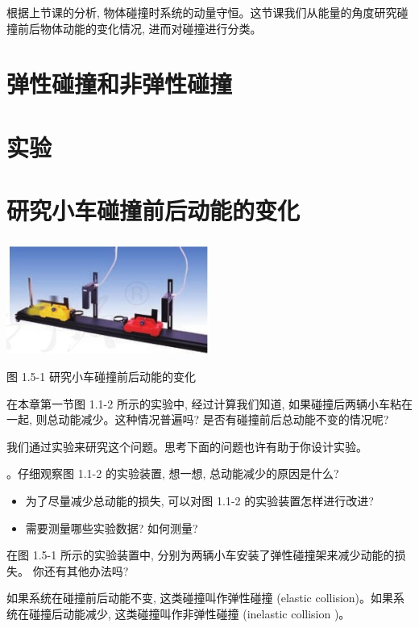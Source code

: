 \documentclass[10pt]{article}
\begin{document}
根据上节课的分析, 物体碰撞时系统的动量守恒。这节课我们从能量的角度研究碰撞前后物体动能的变化情况, 进而对碰撞进行分类。

\section*{弹性碰撞和非弹性碰撞}

\section*{实验}

\section*{研究小车碰撞前后动能的变化}

\begin{center}
\includegraphics[max width=0.5\textwidth]{images/01910e4c-ebb8-7d2c-8f2f-2375bc1d2d12_26_223673.jpg}
\end{center}

图 1.5-1 研究小车碰撞前后动能的变化

在本章第一节图 1.1-2 所示的实验中, 经过计算我们知道, 如果碰撞后两辆小车粘在一起, 则总动能减少。这种情况普遍吗? 是否有碰撞前后总动能不变的情况呢?

我们通过实验来研究这个问题。思考下面的问题也许有助于你设计实验。

。仔细观察图 1.1-2 的实验装置, 想一想, 总动能减少的原因是什么?

\begin{itemize}
\item 为了尽量减少总动能的损失, 可以对图 1.1-2 的实验装置怎样进行改进?
\end{itemize}

\begin{itemize}
\item 需要测量哪些实验数据? 如何测量?
\end{itemize}

在图 1.5-1 所示的实验装置中, 分别为两辆小车安装了弹性碰撞架来减少动能的损失。 你还有其他办法吗?

如果系统在碰撞前后动能不变, 这类碰撞叫作弹性碰撞 (elastic collision)。如果系统在碰撞后动能减少, 这类碰撞叫作非弹性碰撞 (inelastic collision )。
\end{document}
